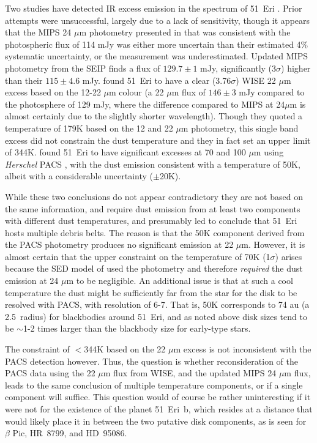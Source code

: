 \documentclass[a4paper,fleqn,usenatbib]{mnras}
\begin{document}
Two studies have detected IR excess emission in the spectrum of 51~Eri
\citep{2014ApJS..212...10P,2014A&A...565A..68R}. Prior attempts were
unsuccessful, largely due to a lack of sensitivity, though it appears
that the MIPS 24 $\mu$m photometry presented in
\citet{2008ApJ...681.1484R} that was consistent with the photospheric
flux of 114 mJy was either more uncertain than their estimated 4\%
systematic uncertainty, or the measurement was underestimated. Updated
MIPS photometry from the SEIP finds a flux of $129.7 \pm 1$ mJy,
significantly (3$\sigma$) higher than their $115 \pm 4.6$
mJy. \cite{2014ApJS..212...10P} found 51~Eri to have a clear
(3.76$\sigma$) WISE 22 $\mu$m excess based on the 12-22 $\mu$m colour (a
22 $\mu$m flux of $146 \pm 3$ mJy compared to the photosphere of 129
mJy, where the difference compared to MIPS at 24$\mu$m is almost
certainly due to the slightly shorter wavelength). Though they quoted a
temperature of 179K based on the 12 and 22 $\mu$m photometry, this
single band excess did not constrain the dust temperature and they in
fact set an upper limit of 344K. \citet{2014A&A...565A..68R} found
51~Eri to have significant excesses at 70 and 100 $\mu$m using
\emph{Herschel} PACS \citep{2010A&A...518L...1P,2010A&A...518L...2P},
with the dust emission consistent with a temperature of 50K, albeit with
a considerable uncertainty ($\pm$20K).

While these two conclusions do not appear contradictory they are not
based on the same information, and require dust emission from at least
two components with different dust temperatures, and presumably led
\citet{2015Sci...350...64M} to conclude that 51~Eri hosts multiple
debris belts. The reason is that the 50K component derived from the PACS
photometry produces no significant emission at 22 $\mu$m. However, it is
almost certain that the upper constraint on the temperature of 70K
(1$\sigma$) arises because the SED model of \citet{2014A&A...565A..68R}
used the \citet{2008ApJ...681.1484R} photometry and therefore
\emph{required} the dust emission at 24 $\mu$m to be negligible. An
additional issue is that at such a cool temperature the dust might be
sufficiently far from the star for the disk to be resolved with PACS,
with resolution of 6-7\arcsec. That is, 50K corresponds to 74 au (a
2.5\arcsec~radius) for blackbodies around 51~Eri, and as noted above
disk sizes tend to be $\sim$1-2 times larger than the blackbody size for
early-type stars.

The constraint of $<$344K based on the 22 $\mu$m excess is not
inconsistent with the PACS detection however. Thus, the question is
whether reconsideration of the PACS data using the 22 $\mu$m flux from
WISE, and the updated MIPS 24 $\mu$m flux, leads to the same conclusion
of multiple temperature components, or if a single component will
suffice. This question would of course be rather uninteresting if it
were not for the existence of the planet 51~Eri~b, which resides at a
distance that would likely place it in between the two putative disk
components, as is seen for $\beta$ Pic, HR~8799, and HD~95086.
\end{document}
